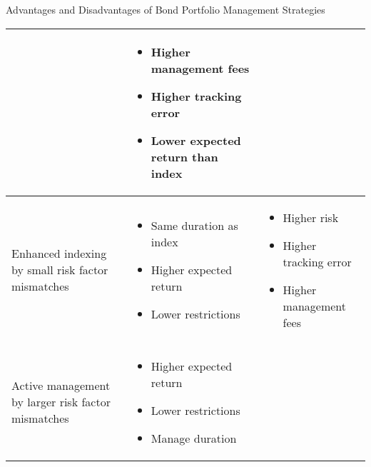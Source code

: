 \documentclass[../custom]{flashcards}
\begin{document}
\begin{flashcard}{Advantages and Disadvantages of Bond Portfolio Management Strategies}
\begin{tabular}{>{\raggedright}p{1in} p{1.6in}  p{1.6in}}
\begin{itemize}[nosep,leftmargin=*]
            \vspace*{-\baselineskip}
        \end{itemize} &
        \vspace{-3mm}
        \begin{itemize}[nosep,leftmargin=*]
            \item Higher management fees
            \item Higher tracking error
            \item Lower expected return than index
            \vspace*{-\baselineskip}
        \end{itemize}
        \\ \midrule
        Enhanced indexing by small risk factor mismatches &
        \vspace{-3mm}
        \begin{itemize}[nolistsep,leftmargin=*]
            \item Same duration as index
            \item Higher expected return
            \item Lower restrictions
            \vspace*{-\baselineskip}
        \end{itemize} &
        \vspace{-3mm}
        \begin{itemize}[nolistsep,leftmargin=*]
            \item Higher risk
            \item Higher tracking error
            \item Higher management fees
            \vspace*{-\baselineskip}
        \end{itemize}
        \\ \midrule
        Active management by larger risk factor mismatches &
        \vspace{-3mm}
        \begin{itemize}[nolistsep,leftmargin=*]
            \item Higher expected return
            \item Lower restrictions
            \item Manage duration
            \vspace*{-\baselineskip}
        \end{itemize} &
        \vspace{-3mm}
        \begin{itemize}[nolistsep,leftmargin=*]

\end{itemize}
\end{tabular}
\end{flashcard}
\end{document}
